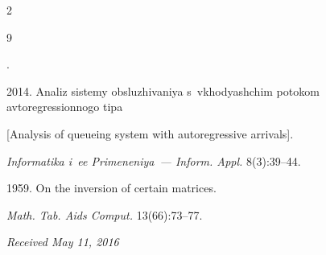 




  \begin{multicols}{2}





\renewcommand{\bibname}{\protect\rmfamily References}







{\small\frenchspacing


 {%




 \begin{thebibliography}{9}




. 


2014. Analiz sistemy obsluzhivaniya s~vkhodyashchim potokom avtoregressionnogo tipa 


[Analysis of queueing system with autoregressive arrivals]. 


\textit{Informatika i~ee Primeneniya~--- Inform. Appl.} 8(3):39--44.





 




 1959. On the inversion of certain matrices. 


\textit{Math. Tab. Aids Comput.} 13(66):73--77.


   \end{thebibliography}





 }


 }





\end{multicols}





\vspace*{-3pt}





\hfill{\small\textit{Received May 11, 2016}}








